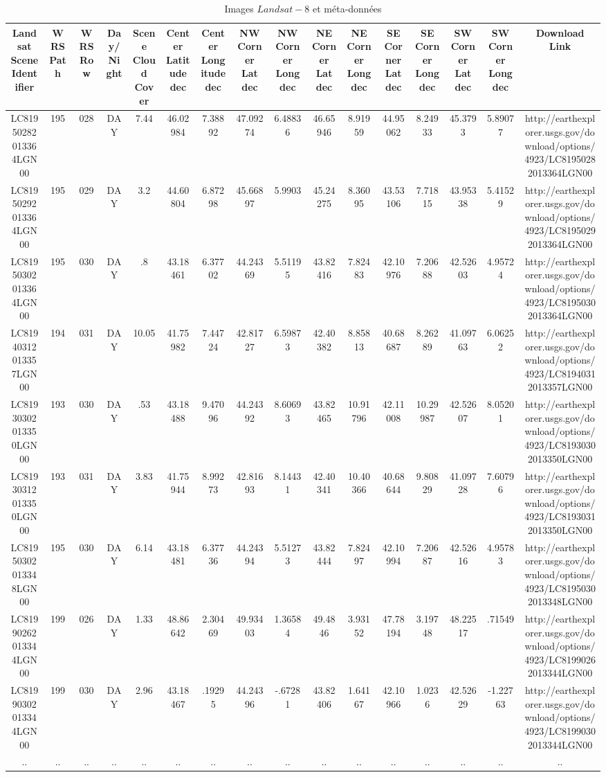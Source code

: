 \documentclass{book}
\begin{document}
\begin{table}
\begin{center}
\begin{adjustbox}{max width=\textwidth}
\begin{tabular}{|c|c|c|c|c|c|c|c|c|c|c|c|c|c|c|c|}
\hline
Landsat Scene Identifier&WRS Path&WRS Row&Day/Night&Scene Cloud Cover&Center Latitude dec&Center Longitude dec&NW Corner Lat dec&NW Corner Long dec&NE Corner Lat dec&NE Corner Long dec&SE Corner Lat dec&SE Corner Long dec&SW Corner Lat dec&SW Corner Long dec&Download Link\\
\hline
LC81950282013364LGN00& 195& 028&DAY&7.44&46.02984&7.38892&47.09274&6.48836&46.65946&8.91959&44.95062&8.24933&45.3793&5.89077&http://earthexplorer.usgs.gov/download/options/4923/LC81950282013364LGN00\\
\hline
LC81950292013364LGN00& 195& 029&DAY&3.2&44.60804&6.87298&45.66897&5.9903&45.24275&8.36095&43.53106&7.71815&43.95338&5.41529&http://earthexplorer.usgs.gov/download/options/4923/LC81950292013364LGN00\\
\hline
LC81950302013364LGN00& 195& 030&DAY&.8&43.18461&6.37702&44.24369&5.51195&43.82416&7.82483&42.10976&7.20688&42.52603&4.95724&http://earthexplorer.usgs.gov/download/options/4923/LC81950302013364LGN00\\
\hline
LC81940312013357LGN00& 194& 031&DAY&10.05&41.75982&7.44724&42.81727&6.59873&42.40382&8.85813&40.68687&8.26289&41.09763&6.06252&http://earthexplorer.usgs.gov/download/options/4923/LC81940312013357LGN00\\
\hline
LC81930302013350LGN00& 193& 030&DAY&.53&43.18488&9.47096&44.24392&8.60693&43.82465&10.91796&42.11008&10.29987&42.52607&8.05201&http://earthexplorer.usgs.gov/download/options/4923/LC81930302013350LGN00\\
\hline
LC81930312013350LGN00& 193& 031&DAY&3.83&41.75944&8.99273&42.81693&8.14431&42.40341&10.40366&40.68644&9.80829&41.09728&7.60796&http://earthexplorer.usgs.gov/download/options/4923/LC81930312013350LGN00\\
\hline
LC81950302013348LGN00& 195& 030&DAY&6.14&43.18481&6.37736&44.24394&5.51273&43.82444&7.82497&42.10994&7.20687&42.52616&4.95783&http://earthexplorer.usgs.gov/download/options/4923/LC81950302013348LGN00\\
\hline
LC81990262013344LGN00& 199& 026&DAY&1.33&48.86642&2.30469&49.93403&1.36584&49.4846&3.93152&47.78194&3.19748&48.22517&.71549&http://earthexplorer.usgs.gov/download/options/4923/LC81990262013344LGN00\\
\hline
LC81990302013344LGN00& 199& 030&DAY&2.96&43.18467&.19295&44.24396&-.67281&43.82406&1.64167&42.10966&1.0236&42.52629&-1.22763&http://earthexplorer.usgs.gov/download/options/4923/LC81990302013344LGN00\\
\hline
..&..&..&..&..&..&..&..&..&..&..&..&..&..&..&..\\
\hline
\end{tabular}
\end{adjustbox}
\end{center}
\caption{Images $Landsat-8$ et méta-données}
\label{attributs}
\end{table}
\end{document}
